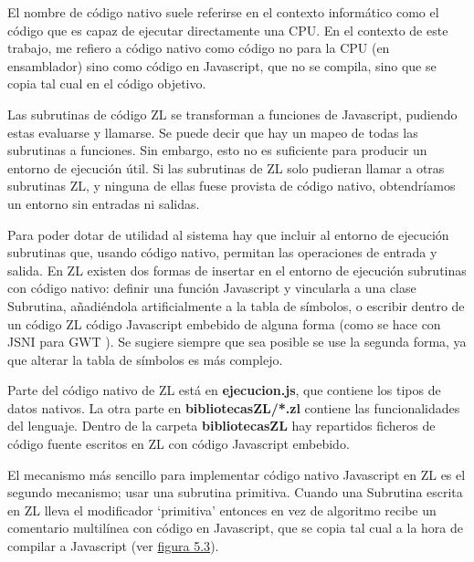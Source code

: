 \documentclass{report}
\begin{document}
	
	El nombre de código nativo suele referirse en el contexto informático como el código que es capaz de ejecutar directamente una CPU. En el contexto de este trabajo, me refiero a código nativo como código no para la CPU (en ensamblador) sino como código en Javascript, que no se compila, sino que se copia tal cual en el código objetivo. 
	
	\vspace{10px}
	
	Las subrutinas de código ZL se transforman a funciones de Javascript, pudiendo estas evaluarse y llamarse. Se puede decir que hay un mapeo de todas las subrutinas a funciones. Sin embargo, esto no es suficiente para producir un entorno de ejecución útil. Si las subrutinas de ZL solo pudieran llamar a otras subrutinas ZL, y ninguna de ellas fuese provista de código nativo, obtendríamos un entorno sin entradas ni salidas. 
	
	\vspace{10px}
	
	Para poder dotar de utilidad al sistema hay que incluir al entorno de ejecución subrutinas que, usando código nativo, permitan las operaciones de entrada y salida. En ZL existen dos formas de insertar en el entorno de ejecución subrutinas con código nativo: definir una función Javascript y vincularla a una clase Subrutina, añadiéndola artificialmente a la tabla de símbolos, o escribir dentro de un código ZL código Javascript embebido de alguna forma (como se hace con JSNI para GWT \cite{jnsigwt}). Se sugiere siempre que sea posible se use la segunda forma, ya que alterar la tabla de símbolos es más complejo.
	
	\vspace{10px}
	
	Parte del código nativo de ZL está en \textbf{ejecucion.js}, que contiene los tipos de datos nativos. La otra parte en \textbf{bibliotecasZL/*.zl} contiene las funcionalidades del lenguaje. Dentro de la carpeta \textbf{bibliotecasZL} hay repartidos ficheros de código fuente escritos en ZL con código Javascript embebido.
	
	\vspace{10px}
	
	\label{subrutinasprimitivas}
	El mecanismo más sencillo para implementar código nativo Javascript en ZL es el segundo mecanismo; usar una subrutina primitiva. Cuando una Subrutina escrita en ZL lleva el modificador `primitiva' entonces en vez de algoritmo recibe un comentario multilínea con código en Javascript, que se copia tal cual a la hora de compilar a Javascript (ver \hyperref[fig:zlyjs]{figura 5.3}).
	
\end{document}
